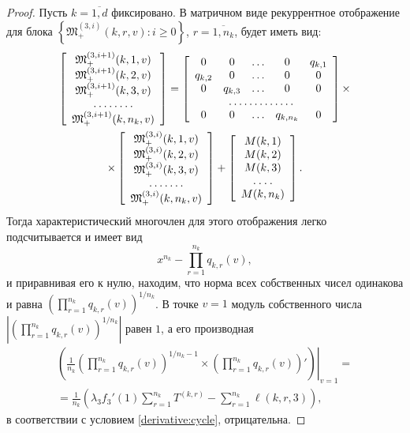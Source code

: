 \begin{proof}
Пусть $k =\overline{1, d}$ фиксировано. В матричном виде рекуррентное отображение для блока $\left\{\mathfrak{M}_+^{(3, i)}(k, r, v)\colon i \geqslant 0\right\}$,  $r =\overline{1, n_k}$,  будет иметь вид:
\begin{multline*}
\left[ \begin{array}{c}
    \mathfrak{M}_+^{(3, i+1)}(k, 1, v) \\
    \mathfrak{M}_+^{(3, i+1)}(k, 2, v) \\
    \mathfrak{M}_+^{(3, i+1)}(k, 3, v) \\
    \hdotsfor{1} \\
    \mathfrak{M}_+^{(3, i+1)}(k, n_k, v)
\end{array}\right]
=
\left[ \begin{array}{c c c c c c}
    0       & 0  & \dots & 0 &   q_{k, 1} \\
    q_{k, 2}       & 0  & \dots & 0 & 0 \\
    0       & q_{k, 3}  & \dots  &0  & 0 \\
    \hdotsfor{5} \\
    0       & 0  & \dots &  q_{k, n_k} & 0 \\
\end{array}\right]
\times \\ \times
\left[ \begin{array}{c}
    \mathfrak{M}_+^{(3, i)}(k, 1, v) \\
    \mathfrak{M}_+^{(3, i)}(k, 2, v) \\
    \mathfrak{M}_+^{(3, i)}(k, 3, v) \\
    \hdotsfor{1} \\
    \mathfrak{M}_+^{(3, i)}(k, n_k, v)\\
\end{array}\right]
+
\left[ \begin{array}{c}
    M(k, 1) \\
    M(k, 2) \\
    M(k, 3) \\
    \hdotsfor{1} \\
    M(k, n_k) \\
\end{array}\right].
\end{multline*}
Тогда характеристический многочлен для этого отображения легко подсчитывается и имеет вид 
$$
x^{n_k} - \prod_{r=1}^{n_k}q_{k, r} (v), 
$$
и приравнивая его к нулю,  находим,  что норма всех собственных чисел одинакова и равна $\left(\prod_{r=1}^{n_k}q_{k, r} (v)\right)^{1/n_k}$. В точке $v=1$ модуль собственного числа $|\left(\prod_{r=1}^{n_k}q_{k, r} (v)\right)^{1/n_k}|$ равен $1$,  а его производная
\begin{multline*}
\left(\frac{1}{n_k} \left.\left(\prod_{r=1}^{n_k}q_{k, r} (v)\right)^{1/n_k - 1} \times \left(\prod_{r=1}^{n_k}q_{k, r}(v)\right) '  \right)\right|_{v=1}=\\
=\frac{1}{n_k} \left(\lambda_3 f_3'(1) \sum_{r=1}^{n_k} T^{(k, r)} -\sum_{r=1}^{n_k} \ell(k, r, 3)\right), 
\end{multline*}
в соответствии с условием \eqref{derivative:cycle},  отрицательна.


\end{proof}
